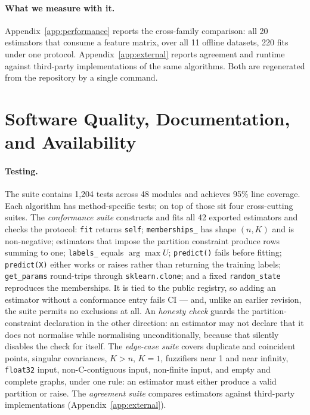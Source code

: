 \documentclass[twoside,11pt]{article}
\begin{document}
\paragraph{What we measure with it.}
Appendix~\ref{app:performance} reports the cross-family comparison: all 20
estimators that consume a feature matrix, over all 11 offline datasets, 220
fits under one protocol. Appendix~\ref{app:external} reports agreement and
runtime against third-party implementations of the same algorithms. Both are
regenerated from the repository by a single command.

\section{Software Quality, Documentation, and Availability}
\label{sec:quality}

\paragraph{Testing.}
The suite contains 1{,}204 tests across 48 modules and achieves 95\% line
coverage. Each algorithm has method-specific tests; on top of those sit four
cross-cutting suites. The \emph{conformance suite} constructs and fits all 42
exported estimators and checks the protocol: \texttt{fit} returns
\texttt{self}; \texttt{memberships\_} has shape $(n, K)$ and is non-negative;
estimators that impose the partition constraint produce rows summing to one;
\texttt{labels\_} equals $\arg\max U$; \texttt{predict()} fails before
fitting; \texttt{predict(X)} either works or raises rather than returning the
training labels; \texttt{get\_params} round-trips through
\texttt{sklearn.clone}; and a fixed \texttt{random\_state} reproduces the
memberships. It is tied to the public registry, so adding an estimator
without a conformance entry fails CI --- and, unlike an earlier revision, the
suite permits no exclusions at all. An \emph{honesty check} guards the
partition-constraint declaration in the other direction: an estimator may not
declare that it does not normalise while normalising unconditionally, because
that silently disables the check for itself. The \emph{edge-case suite}
covers duplicate and coincident points, singular covariances, $K > n$,
$K = 1$, fuzzifiers near 1 and near infinity, \texttt{float32} input,
non-C-contiguous input, non-finite input, and empty and complete graphs,
under one rule: an estimator must either produce a valid partition or raise.
The \emph{agreement suite} compares estimators against third-party
implementations (Appendix~\ref{app:external}).
\end{document}
